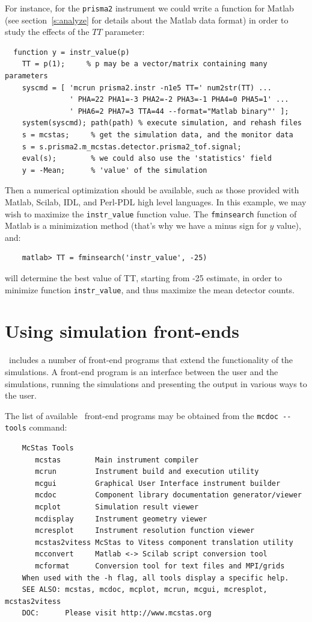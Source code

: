 For instance, for the \verb+prisma2+ instrument we could write a function for Matlab (see section~\ref{s:analyze} for details about the Matlab data format) in order to study the effects of the $TT$ parameter:
\begin{verbatim}
  function y = instr_value(p)
    TT = p(1);     % p may be a vector/matrix containing many parameters
    syscmd = [ 'mcrun prisma2.instr -n1e5 TT=' num2str(TT) ...
               ' PHA=22 PHA1=-3 PHA2=-2 PHA3=-1 PHA4=0 PHA5=1' ...
               ' PHA6=2 PHA7=3 TTA=44 --format="Matlab binary"' ];
    system(syscmd); path(path) % execute simulation, and rehash files
    s = mcstas;     % get the simulation data, and the monitor data
    s = s.prisma2.m_mcstas.detector.prisma2_tof.signal;
    eval(s);        % we could also use the 'statistics' field
    y = -Mean;      % 'value' of the simulation
\end{verbatim}

Then a numerical optimization should be available, such as those provided with Matlab, Scilab, IDL, and Perl-PDL high level languages. In this example, we may wish to maximize the \verb+instr_value+ function value. The \verb+fminsearch+ function of Matlab is a minimization method (that's why we have a minus sign for $y$ value), and:
\begin{verbatim}
    matlab> TT = fminsearch('instr_value', -25)
\end{verbatim}
will determine the best value of TT, starting from -25 estimate, in order to minimize function \verb+instr_value+, and thus maximize the mean detector counts.

\section{Using simulation front-ends}
\label{s:frontends}

\MCS\ includes a number of front-end programs that extend the
functionality of the simulations. A front-end program is an interface
between the user and the simulations, running the simulations and
presenting the output in various ways to the user.

The list of available \MCS\ front-end programs may be obtained from the \verb+mcdoc --tools+ command:
\begin{verbatim}
    McStas Tools
       mcstas        Main instrument compiler
       mcrun         Instrument build and execution utility
       mcgui         Graphical User Interface instrument builder
       mcdoc         Component library documentation generator/viewer
       mcplot        Simulation result viewer
       mcdisplay     Instrument geometry viewer
       mcresplot     Instrument resolution function viewer
       mcstas2vitess McStas to Vitess component translation utility
       mcconvert     Matlab <-> Scilab script conversion tool
       mcformat      Conversion tool for text files and MPI/grids
    When used with the -h flag, all tools display a specific help.
    SEE ALSO: mcstas, mcdoc, mcplot, mcrun, mcgui, mcresplot, mcstas2vitess
    DOC:      Please visit http://www.mcstas.org
\end{verbatim}

